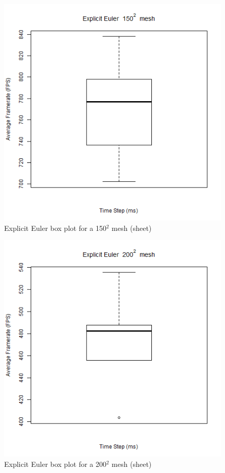       \begin{figure}
    \begin{center}
      \includegraphics[scale=.9]{Figures/sheet_ee_150_box}
    \end{center}
    \caption{Explicit Euler box plot for a 150$^{2}$ mesh (sheet)}
    \label{fig:ee box 150 sheet}
  \end{figure}
  
      \begin{figure}
    \begin{center}
      \includegraphics[scale=.9]{Figures/sheet_ee_200_box}
    \end{center}
    \caption{Explicit Euler box plot for a 200$^{2}$ mesh (sheet)}
    \label{fig:ee box 200 sheet}
  \end{figure}
  
